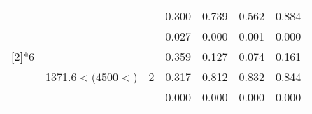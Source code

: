 \begin{table}[htbp]
\begin{tabular}{ccccccc}
          &       &       & 0.300  & 0.739  & 0.562  & 0.884  \\
          &       &       & 0.027  & 0.000  & 0.001  & 0.000  \bigstrut\\\cline{4-7}\noalign{\smallskip}
    \multirow{3}[2]{*}{6} & \multirow{3}[2]{2.5cm}{1371.6$< (4500<$)} & \multirow{3}[2]{*}{2} & 0.359  & 0.127  & 0.074  & 0.161  \\
          &       &       & 0.317  & 0.812  & 0.832  & 0.844  \\
          &       &       & 0.000  & 0.000  & 0.000  & 0.000  \\
    \bottomrule
    \end{tabular}%
  \label{tab:Set2SWJD}%
\end{table}%
